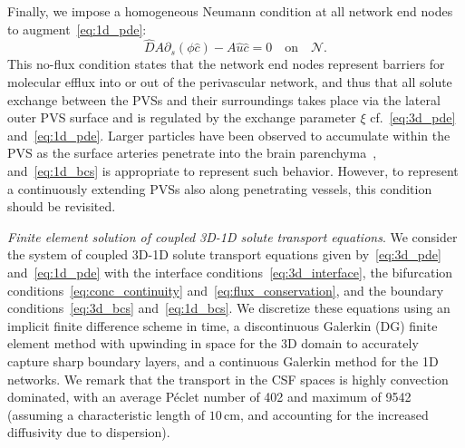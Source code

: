 \documentclass[fleqn,10pt]{wlscirep}
\begin{document}
Finally, we impose a homogeneous Neumann condition at all network end
nodes to augment~\eqref{eq:1d_pde}:
\begin{equation}
    \hat D A \partial_s (\phi \hat c) - A \hat u \hat c  = 0 \quad \mathrm{on} \quad \mathcal{N}.
    \label{eq:1d_bcs}
\end{equation}
This no-flux condition states that the network end nodes represent
barriers for molecular efflux into or out of the perivascular network,
and thus that all solute exchange between the PVSs and their
surroundings takes place via the lateral outer PVS surface and is
regulated by the exchange parameter $\xi$ cf.~\eqref{eq:3d_pde}
and~\eqref{eq:1d_pde}. Larger particles have been observed to
accumulate within the PVS as the surface arteries penetrate into the
brain parenchyma~\cite{mestre2018flow, bedussi2018paravascular},
and~\eqref{eq:1d_bcs} is appropriate to represent such
behavior. However, to represent a continuously extending PVSs also
along penetrating vessels, this condition should be revisited.





\textit{Finite element solution of coupled 3D-1D solute transport equations}. 
We consider the system of coupled 3D-1D solute transport equations
given by~\eqref{eq:3d_pde} and~\eqref{eq:1d_pde} with the interface
conditions~\eqref{eq:3d_interface}, the bifurcation
conditions~\eqref{eq:conc_continuity}
and~\eqref{eq:flux_conservation}, and the boundary
conditions~\eqref{eq:3d_bcs} and~\eqref{eq:1d_bcs}. We discretize
these equations using an implicit finite difference scheme in time, 
a discontinuous Galerkin (DG) finite element method with upwinding in space for the 3D domain to accurately capture sharp boundary layers, and a continuous Galerkin method for the 1D networks. We remark that the transport in the CSF spaces is highly convection dominated, with an average Péclet number of 402 and maximum of 9542 (assuming a characteristic length of $10\,$cm, and accounting for the increased diffusivity due to dispersion).
\end{document}
